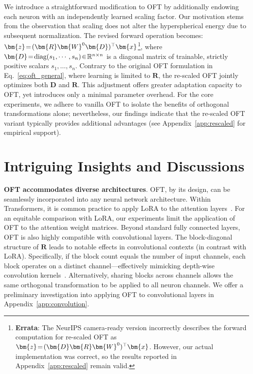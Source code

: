 {We introduce a straightforward modification to OFT by additionally endowing each neuron with an independently learned scaling factor. Our motivation stems from the observation that scaling does not alter the hyperspherical energy due to subsequent normalization. The revised forward operation becomes: $\thickmuskip=2mu \medmuskip=2mu\bm{z}=(\bm{R}\bm{W}^0\bm{D})^\top\bm{x}$\footnote{\textbf{Errata}: The NeurIPS camera-ready version incorrectly describes the forward computation for re-scaled OFT as $\thickmuskip=2mu \medmuskip=2mu\bm{z}=(\bm{D}\bm{R}\bm{W}^0)^\top\bm{x}$. However, our actual implementation was correct, so the results reported in Appendix~\ref{app:rescaled} remain valid.}, where $\thickmuskip=2mu \medmuskip=2mu \bm{D}=\text{diag}(s_1,\cdots,s_n)\in\mathbb{R}^{n\times n}$ is a diagonal matrix of trainable, strictly positive scalars $s_1,\ldots,s_n$. Contrary to the original OFT formulation in Eq.~\eqref{eq:oft_general}, where learning is limited to $\bm{R}$, the re-scaled OFT jointly optimizes both $\bm{D}$ and $\bm{R}$. This adjustment offers greater adaptation capacity to OFT, yet introduces only a minimal parameter overhead. For the core experiments, we adhere to vanilla OFT to isolate the benefits of orthogonal transformations alone; nevertheless, our findings indicate that the re-scaled OFT variant typically provides additional advantages (see Appendix~\ref{app:rescaled} for empirical support).

\section{Intriguing Insights and Discussions}

\textbf{OFT accommodates diverse architectures}. OFT, by its design, can be seamlessly incorporated into any neural network architecture. Within Transformers, it is common practice to apply LoRA to the attention layers~\cite{hulora2022}. For an equitable comparison with LoRA, our experiments limit the application of OFT to the attention weight matrices. Beyond standard fully connected layers, OFT is also highly compatible with convolutional layers. The block-diagonal structure of $\bm{R}$ leads to notable effects in convolutional contexts (in contrast with LoRA). Specifically, if the block count equals the number of input channels, each block operates on a distinct channel—effectively mimicking depth-wise convolution kernels~\cite{chollet2017xception}. Alternatively, sharing blocks across channels allows the same orthogonal transformation to be applied to all neuron channels. We offer a preliminary investigation into applying OFT to convolutional layers in Appendix~\ref{app:convolution}.

}
